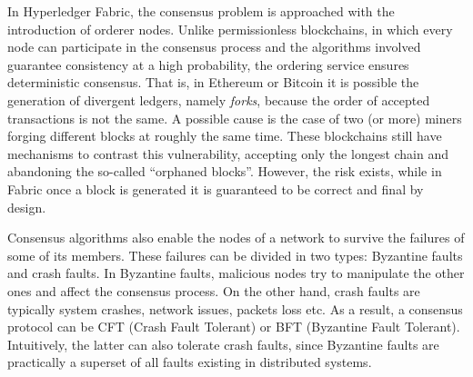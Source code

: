 In Hyperledger Fabric, the consensus problem is approached with the introduction of orderer nodes. Unlike permissionless blockchains, in which every node can participate in the consensus process and the algorithms involved guarantee consistency at a high probability, the ordering service ensures deterministic consensus. That is, in Ethereum or Bitcoin it is possible the generation of divergent ledgers, namely \emph{forks}, because the order of accepted transactions is not the same. A possible cause is the case of two (or more) miners forging different blocks at roughly the same time. These blockchains still have mechanisms to contrast this vulnerability, accepting only the longest chain and abandoning the so-called ``orphaned blocks''. However, the risk exists, while in Fabric once a block is generated it is guaranteed to be correct and final by design.

Consensus algorithms also enable the nodes of a network to survive the failures of some of its members. These failures can be divided in two types: Byzantine faults and crash faults. In Byzantine faults, malicious nodes try to manipulate the other ones and affect the consensus process. On the other hand, crash faults are typically system crashes, network issues, packets loss etc. As a result, a consensus protocol can be CFT (Crash Fault Tolerant) or BFT (Byzantine Fault Tolerant). Intuitively, the latter can also tolerate crash faults, since Byzantine faults are practically a superset of all faults existing in distributed systems.

